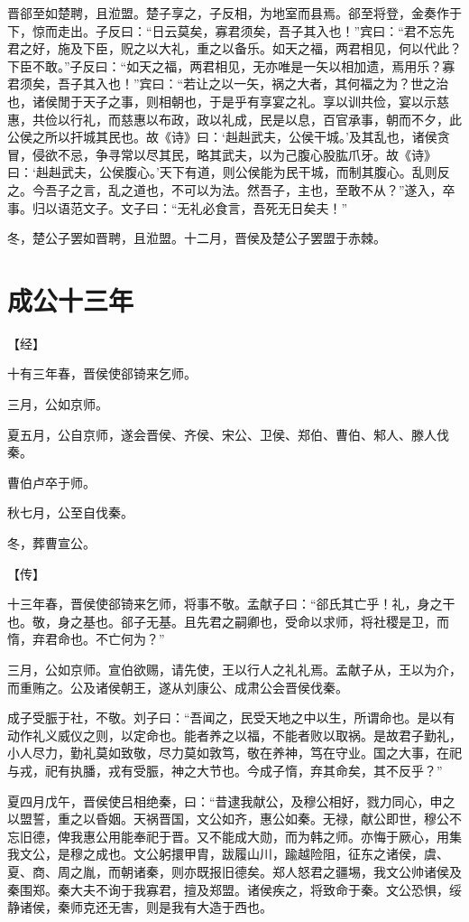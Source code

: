 \documentclass[a4paper,12pt,UTF8,twoside]{ctexbook}
\begin{document}
晋郤至如楚聘，且涖盟。楚子享之，子反相，为地室而县焉。郤至将登，金奏作于下，惊而走出。子反曰：“日云莫矣，寡君须矣，吾子其入也！”宾曰：“君不忘先君之好，施及下臣，贶之以大礼，重之以备乐。如天之福，两君相见，何以代此？下臣不敢。”子反曰：“如天之福，两君相见，无亦唯是一矢以相加遗，焉用乐？寡君须矣，吾子其入也！”宾曰：“若让之以一矢，祸之大者，其何福之为？世之治也，诸侯閒于天子之事，则相朝也，于是乎有享宴之礼。享以训共俭，宴以示慈惠，共俭以行礼，而慈惠以布政，政以礼成，民是以息，百官承事，朝而不夕，此公侯之所以扞城其民也。故《诗》曰：‘赳赳武夫，公侯干城。’及其乱也，诸侯贪冒，侵欲不忌，争寻常以尽其民，略其武夫，以为己腹心股肱爪牙。故《诗》曰：‘赳赳武夫，公侯腹心。’天下有道，则公侯能为民干城，而制其腹心。乱则反之。今吾子之言，乱之道也，不可以为法。然吾子，主也，至敢不从？”遂入，卒事。归以语范文子。文子曰：“无礼必食言，吾死无日矣夫！”

冬，楚公子罢如晋聘，且涖盟。十二月，晋侯及楚公子罢盟于赤棘。


\chapter{成公十三年}



【经】

十有三年春，晋侯使郤锜来乞师。

三月，公如京师。

夏五月，公自京师，遂会晋侯、齐侯、宋公、卫侯、郑伯、曹伯、邾人、滕人伐秦。

曹伯卢卒于师。

秋七月，公至自伐秦。

冬，葬曹宣公。

【传】

十三年春，晋侯使郤锜来乞师，将事不敬。孟献子曰：“郤氏其亡乎！礼，身之干也。敬，身之基也。郤子无基。且先君之嗣卿也，受命以求师，将社稷是卫，而惰，弃君命也。不亡何为？”

三月，公如京师。宣伯欲赐，请先使，王以行人之礼礼焉。孟献子从，王以为介，而重贿之。公及诸侯朝王，遂从刘康公、成肃公会晋侯伐秦。

成子受脤于社，不敬。刘子曰：“吾闻之，民受天地之中以生，所谓命也。是以有动作礼义威仪之则，以定命也。能者养之以福，不能者败以取祸。是故君子勤礼，小人尽力，勤礼莫如致敬，尽力莫如敦笃，敬在养神，笃在守业。国之大事，在祀与戎，祀有执膰，戎有受脤，神之大节也。今成子惰，弃其命矣，其不反乎？”

夏四月戊午，晋侯使吕相绝秦，曰：“昔逮我献公，及穆公相好，戮力同心，申之以盟誓，重之以昏姻。天祸晋国，文公如齐，惠公如秦。无禄，献公即世，穆公不忘旧德，俾我惠公用能奉祀于晋。又不能成大勋，而为韩之师。亦悔于厥心，用集我文公，是穆之成也。文公躬擐甲胄，跋履山川，踰越险阻，征东之诸侯，虞、夏、商、周之胤，而朝诸秦，则亦既报旧德矣。郑人怒君之疆埸，我文公帅诸侯及秦围郑。秦大夫不询于我寡君，擅及郑盟。诸侯疾之，将致命于秦。文公恐惧，绥静诸侯，秦师克还无害，则是我有大造于西也。
\end{document}
